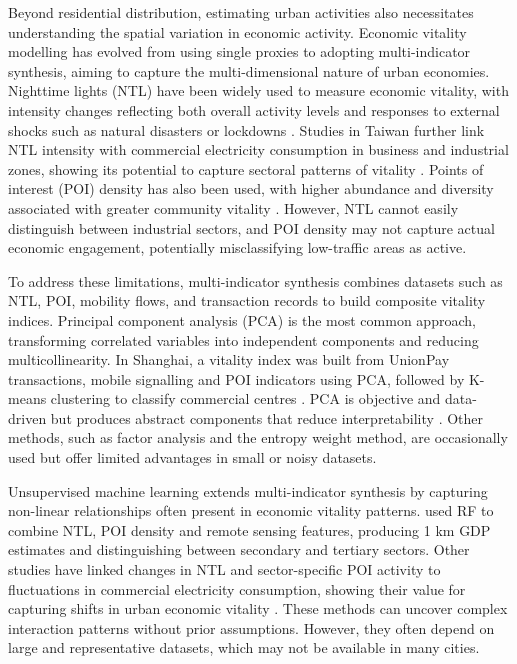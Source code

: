 \documentclass[
  12pt,
  oneside]{book}
\begin{document}
Beyond residential distribution, estimating urban activities also necessitates understanding the spatial variation in economic activity. Economic vitality modelling has evolved from using single proxies to adopting multi-indicator synthesis, aiming to capture the multi-dimensional nature of urban economies. Nighttime lights (NTL) have been widely used to measure economic vitality, with intensity changes reflecting both overall activity levels and responses to external shocks such as natural disasters or lockdowns \autocite{MeasuringQuarterlyEconomic2022,hendersonMeasuringEconomicGrowth2012}. Studies in Taiwan further link NTL intensity with commercial electricity consumption in business and industrial zones, showing its potential to capture sectoral patterns of vitality \autocite{changSpatiotemporalImpactUrban2025}. Points of interest (POI) density has also been used, with higher abundance and diversity associated with greater community vitality \autocite{linMeasuringNonLinearRelationship2022}. However, NTL cannot easily distinguish between industrial sectors, and POI density may not capture actual economic engagement, potentially misclassifying low-traffic areas as active.

To address these limitations, multi-indicator synthesis combines datasets such as NTL, POI, mobility flows, and transaction records to build composite vitality indices. Principal component analysis (PCA) is the most common approach, transforming correlated variables into independent components and reducing multicollinearity. In Shanghai, a vitality index was built from UnionPay transactions, mobile signalling and POI indicators using PCA, followed by K-means clustering to classify commercial centres \autocite{huEvaluationComprehensiveVitality2025}. PCA is objective and data-driven but produces abstract components that reduce interpretability \autocite{elitedatascienceDimensionalityReductionAlgorithms2017}. Other methods, such as factor analysis and the entropy weight method, are occasionally used but offer limited advantages in small or noisy datasets.

Unsupervised machine learning extends multi-indicator synthesis by capturing non-linear relationships often present in economic vitality patterns. \textcite{chenMappingChinasRegional2021} used RF to combine NTL, POI density and remote sensing features, producing 1 km GDP estimates and distinguishing between secondary and tertiary sectors. Other studies have linked changes in NTL and sector-specific POI activity to fluctuations in commercial electricity consumption, showing their value for capturing shifts in urban economic vitality \autocite{wangHumanActivityChanges2022}. These methods can uncover complex interaction patterns without prior assumptions. However, they often depend on large and representative datasets, which may not be available in many cities.
\end{document}
